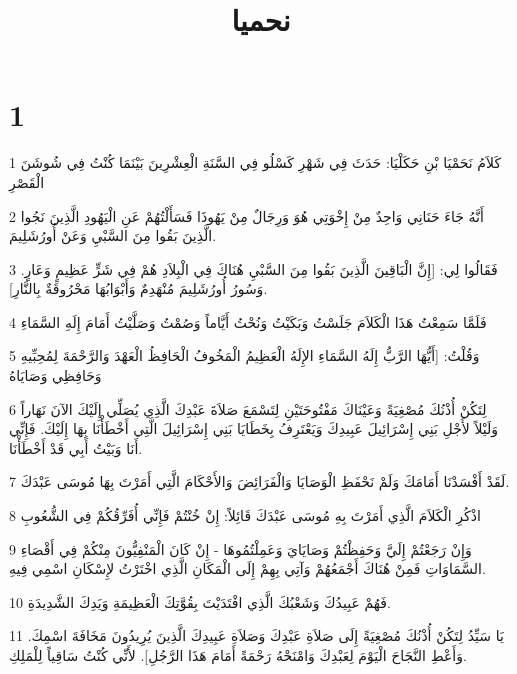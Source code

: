

\title{نحميا}


\chapter{1}

\par 1 كَلاَمُ نَحَمْيَا بْنِ حَكَلْيَا: حَدَثَ فِي شَهْرِ كَسْلُو فِي السَّنَةِ الْعِشْرِينَ بَيْنَمَا كُنْتُ فِي شُوشَنَ الْقَصْرِ
\par 2 أَنَّهُ جَاءَ حَنَانِي وَاحِدٌ مِنْ إِخْوَتِي هُوَ وَرِجَالٌ مِنْ يَهُوذَا فَسَأَلْتُهُمْ عَنِ الْيَهُودِ الَّذِينَ نَجُوا الَّذِينَ بَقُوا مِنَ السَّبْيِ وَعَنْ أُورُشَلِيمَ.
\par 3 فَقَالُوا لِي: [إِنَّ الْبَاقِينَ الَّذِينَ بَقُوا مِنَ السَّبْيِ هُنَاكَ فِي الْبِلاَدِ هُمْ فِي شَرٍّ عَظِيمٍ وَعَارٍ. وَسُورُ أُورُشَلِيمَ مُنْهَدِمٌ وَأَبْوَابُهَا مَحْرُوقَةٌ بِالنَّارِ].
\par 4 فَلَمَّا سَمِعْتُ هَذَا الْكَلاَمَ جَلَسْتُ وَبَكَيْتُ وَنُحْتُ أَيَّاماً وَصُمْتُ وَصَلَّيْتُ أَمَامَ إِلَهِ السَّمَاءِ
\par 5 وَقُلْتُ: [أَيُّهَا الرَّبُّ إِلَهُ السَّمَاءِ الإِلَهُ الْعَظِيمُ الْمَخُوفُ الْحَافِظُ الْعَهْدَ وَالرَّحْمَةَ لِمُحِبِّيهِ وَحَافِظِي وَصَايَاهُ
\par 6 لِتَكُنْ أُذْنُكَ مُصْغِيَةً وَعَيْنَاكَ مَفْتُوحَتَيْنِ لِتَسْمَعَ صَلاَةَ عَبْدِكَ الَّذِي يُصَلِّي إِلَيْكَ الآنَ نَهَاراً وَلَيْلاً لأَجْلِ بَنِي إِسْرَائِيلَ عَبِيدِكَ وَيَعْتَرِفُ بِخَطَايَا بَنِي إِسْرَائِيلَ الَّتِي أَخْطَأْنَا بِهَا إِلَيْكَ. فَإِنِّي أَنَا وَبَيْتُ أَبِي قَدْ أَخْطَأْنَا.
\par 7 لَقَدْ أَفْسَدْنَا أَمَامَكَ وَلَمْ نَحْفَظِ الْوَصَايَا وَالْفَرَائِضَ وَالأَحْكَامَ الَّتِي أَمَرْتَ بِهَا مُوسَى عَبْدَكَ.
\par 8 اذْكُرِ الْكَلاَمَ الَّذِي أَمَرْتَ بِهِ مُوسَى عَبْدَكَ قَائِلاً: إِنْ خُنْتُمْ فَإِنِّي أُفَرِّقُكُمْ فِي الشُّعُوبِ
\par 9 وَإِنْ رَجَعْتُمْ إِلَيَّ وَحَفِظْتُمْ وَصَايَايَ وَعَمِلْتُمُوهَا - إِنْ كَانَ الْمَنْفِيُّونَ مِنْكُمْ فِي أَقْصَاءِ السَّمَاوَاتِ فَمِنْ هُنَاكَ أَجْمَعُهُمْ وَآتِي بِهِمْ إِلَى الْمَكَانِ الَّذِي اخْتَرْتُ لإِسْكَانِ اسْمِي فِيهِ.
\par 10 فَهُمْ عَبِيدُكَ وَشَعْبُكَ الَّذِي افْتَدَيْتَ بِقُوَّتِكَ الْعَظِيمَةِ وَيَدِكَ الشَّدِيدَةِ.
\par 11 يَا سَيِّدُ لِتَكُنْ أُذْنُكَ مُصْغِيَةً إِلَى صَلاَةِ عَبْدِكَ وَصَلاَةِ عَبِيدِكَ الَّذِينَ يُرِيدُونَ مَخَافَةَ اسْمِكَ. وَأَعْطِ النَّجَاحَ الْيَوْمَ لِعَبْدِكَ وَامْنَحْهُ رَحْمَةً أَمَامَ هَذَا الرَّجُلِ]. لأَنِّي كُنْتُ سَاقِياً لِلْمَلِكِ.

